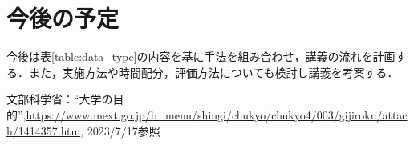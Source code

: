 \documentclass[twocolumn,10pt,a4j]{ltjsarticle}
\begin{document}
\section{今後の予定}

今後は表\ref{table:data_type}の内容を基に手法を組み合わせ，講義の流れを計画する．また，実施方法や時間配分，評価方法についても検討し講義を考案する．


\begin{thebibliography}{99}
 文部科学省：``大学の目的'',\url{https://www.mext.go.jp/b_menu/shingi/chukyo/chukyo4/003/gijiroku/attach/1414357.htm}, 2023/7/17参照


\end{thebibliography}
\end{document}
